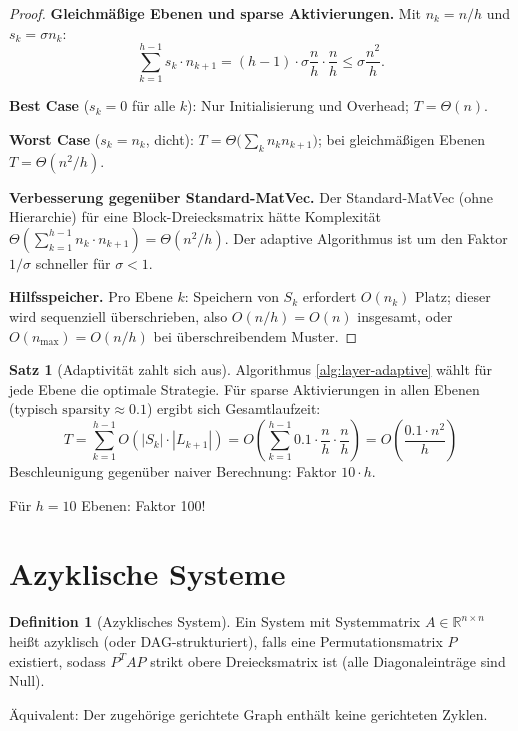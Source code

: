 \documentclass[a4paper,12pt]{report}
\theoremstyle{definition}
\newtheorem{definition}{Definition}
\newtheorem{satz}{Satz}
\begin{document}
\begin{proof}
		\textbf{Gleichmäßige Ebenen und sparse Aktivierun\-gen.} Mit $n_k = n/h$ und $s_k = \sigma n_k$:
		\[
			\sum_{k=1}^{h-1} s_k \cdot n_{k+1} = (h-1) \cdot \sigma \frac{n}{h} \cdot \frac{n}{h} \leq \sigma \frac{n^2}{h}.
		\]

		\textbf{Best Case} ($s_k = 0$ für alle $k$): Nur Initialisierung und Overhead; $T = \Theta(n)$.

		\textbf{Worst Case} ($s_k = n_k$, dicht): $T = \Theta\!\bigl(\sum_{k} n_k n_{k+1}\bigr)$; bei gleichmäßigen Ebenen $T = \Theta(n^2/h)$.

		\textbf{Verbesserung gegenüber Standard-MatVec.} Der Standard-MatVec (ohne Hierarchie) für eine Block-Dreiecksmatrix hätte Komplexität $\Theta(\sum_{k=1}^{h-1} n_k \cdot n_{k+1}) = \Theta(n^2/h)$. Der adaptive Algorithmus ist um den Faktor $1/\sigma$ schneller für $\sigma < 1$.

		\textbf{Hilfsspeicher.} Pro Ebene $k$: Speichern von $S_k$ erfordert $O(n_k)$ Platz; dieser wird sequenziell überschrieben, also $O(n/h) = O(n)$ insgesamt, oder $O(n_{\max}) = O(n/h)$ bei überschreibendem Muster.
	\end{proof}

	\begin{satz}[Adaptivität zahlt sich aus]
		Algorithmus \ref{alg:layer-adaptive} wählt für jede Ebene die optimale Strategie. Für sparse Aktivierungen in allen Ebenen (typisch $\text{sparsity} \approx 0.1$) ergibt sich Gesamtlaufzeit:
		\[
		T = \sum_{k=1}^{h-1} O(|S_k| \cdot |L_{k+1}|) = O\left(\sum_{k=1}^{h-1} 0.1 \cdot \frac{n}{h} \cdot \frac{n}{h}\right) = O\left(\frac{0.1 \cdot n^2}{h}\right)
		\]
		Beschleunigung gegenüber naiver Berechnung: Faktor $10 \cdot h$.
		
		Für $h = 10$ Ebenen: Faktor 100!
	\end{satz}
	
	\section{Azyklische Systeme}
	
	\begin{definition}[Azyklisches System]
		Ein System mit Systemmatrix $A \in \mathbb{R}^{n \times n}$ heißt azyklisch (oder DAG-strukturiert), falls eine Permutationsmatrix $P$ existiert, sodass $P^T A P$ strikt obere Dreiecksmatrix ist (alle Diagonaleinträge sind Null).
		
		Äquivalent: Der zugehörige gerichtete Graph enthält keine gerichteten Zyklen.
	\end{definition}
	
\end{document}
